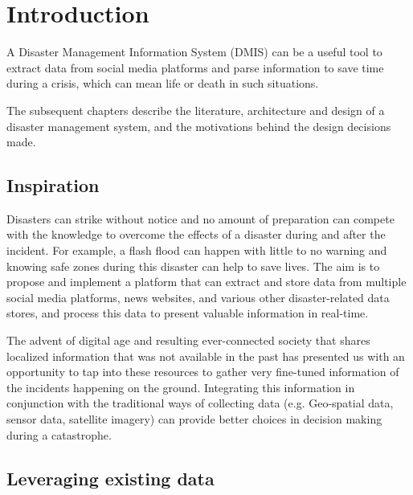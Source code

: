 \chapter{Introduction}

A Disaster Management Information System (DMIS) can be a useful tool to extract data from social media platforms and parse information to save time during a crisis, which can mean life or death in such situations.

The subsequent chapters describe the literature, architecture and design of a disaster management system, and the motivations behind the design decisions made.

\section{Inspiration}

Disasters can strike without notice and no amount of preparation can compete with the knowledge to overcome the effects of a disaster during and after the incident. For example, a flash flood can happen with little to no warning and knowing safe zones during this disaster can help to save lives. The aim is to propose and implement a platform that can extract and store data from multiple social media platforms, news websites, and various other disaster-related data stores, and process this data to present valuable information in real-time.

The advent of digital age and resulting ever-connected society that shares localized information that was not available in the past has presented us with an opportunity to tap into these resources to gather very fine-tuned information of the incidents happening on the ground. Integrating this information in conjunction with the traditional ways of collecting data (e.g. Geo-spatial data, sensor data, satellite imagery) can provide better choices in decision making during a catastrophe.

\section{Leveraging existing data}

